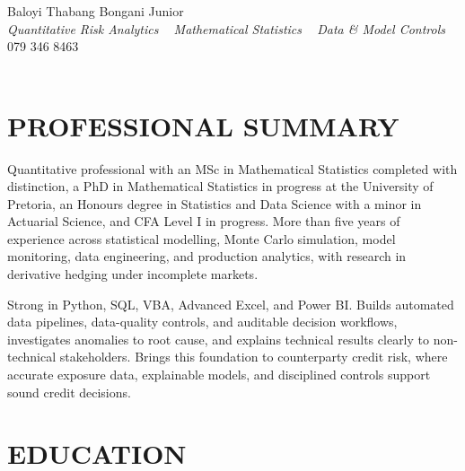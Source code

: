 \documentclass[letterpaper,11pt]{article}
\begin{document}


\begin{center}
    {\huge Baloyi Thabang Bongani Junior} \\ \vspace{2pt}
    {\large\textit{Quantitative Risk Analytics \textbar~ Mathematical Statistics \textbar~ Data \& Model Controls}} \\ \vspace{4pt}
    {079 346 8463} ~\textbar~
    \href{mailto:Baloyibongani1@gmail.com}{\color{blue}{Baloyibongani1@gmail.com}} \\ \vspace{1pt}
    \href{https://www.linkedin.com/in/thabang-bongani-junior-baloyi-2622b0286/}{\color{blue}{linkedin.com/in/thabang-bongani-junior-baloyi}} ~\textbar~
    \href{https://github.com/thabangTheActuaryCoder}{\color{blue}{github.com/thabangTheActuaryCoder}}
    \vspace{-7pt}
\end{center}

\section{PROFESSIONAL SUMMARY}
\vspace{4pt}
{\small
\noindent
Quantitative professional with an MSc in Mathematical Statistics completed with distinction, a PhD in
Mathematical Statistics in progress at the University of Pretoria,
an Honours degree in Statistics and Data Science with a minor in Actuarial Science, and CFA
Level I in progress. More than five years of experience across statistical modelling, Monte Carlo
simulation, model monitoring, data engineering, and production analytics, with research in
derivative hedging under incomplete markets.

\vspace{4pt}

\noindent
Strong in Python, SQL, VBA, Advanced Excel, and Power BI. Builds automated data pipelines,
data-quality controls, and auditable decision workflows, investigates anomalies to root cause,
and explains technical results clearly to non-technical stakeholders. Brings this foundation to
counterparty credit risk, where accurate exposure data, explainable models, and disciplined
controls support sound credit decisions.
}
\vspace{-2pt}
\section{EDUCATION}
\vspace{4pt}
\end{document}
